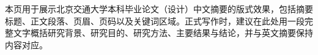 \begin{cnabstract}
本页用于展示北京交通大学本科毕业论文（设计）中文摘要的版式效果，包括摘要标题、正文段落、页眉、页码以及关键词区域。正式写作时，建议在此处用一段完整文字概括研究背景、研究目的、研究方法、主要结果与结论，并与英文摘要保持内容对应。

\placeholderpar

\end{cnabstract}
